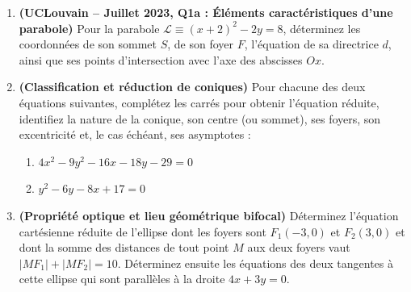 \begin{enumerate}[label=\textbf{Exercice 6.\arabic* --}, align=left, leftmargin=*]
    \item \textbf{(UCLouvain -- Juillet 2023, Q1a : Éléments caractéristiques d'une parabole)}
    Pour la parabole $\mathcal{L} \equiv (x+2)^2 - 2y = 8$, déterminez les coordonnées de son sommet $S$, de son foyer $F$, l'équation de sa directrice $d$, ainsi que ses points d'intersection avec l'axe des abscisses $Ox$.

    \item \textbf{(Classification et réduction de coniques)}
    Pour chacune des deux équations suivantes, complétez les carrés pour obtenir l'équation réduite, identifiez la nature de la conique, son centre (ou sommet), ses foyers, son excentricité et, le cas échéant, ses asymptotes :
    \begin{enumerate}[label=(\alph*)]
        \item $4x^2 - 9y^2 - 16x - 18y - 29 = 0$
        \item $y^2 - 6y - 8x + 17 = 0$
    \end{enumerate}

    \item \textbf{(Propriété optique et lieu géométrique bifocal)}
    Déterminez l'équation cartésienne réduite de l'ellipse dont les foyers sont $F_1(-3, 0)$ et $F_2(3, 0)$ et dont la somme des distances de tout point $M$ aux deux foyers vaut $|MF_1| + |MF_2| = 10$. Déterminez ensuite les équations des deux tangentes à cette ellipse qui sont parallèles à la droite $4x + 3y = 0$.

\end{enumerate}
